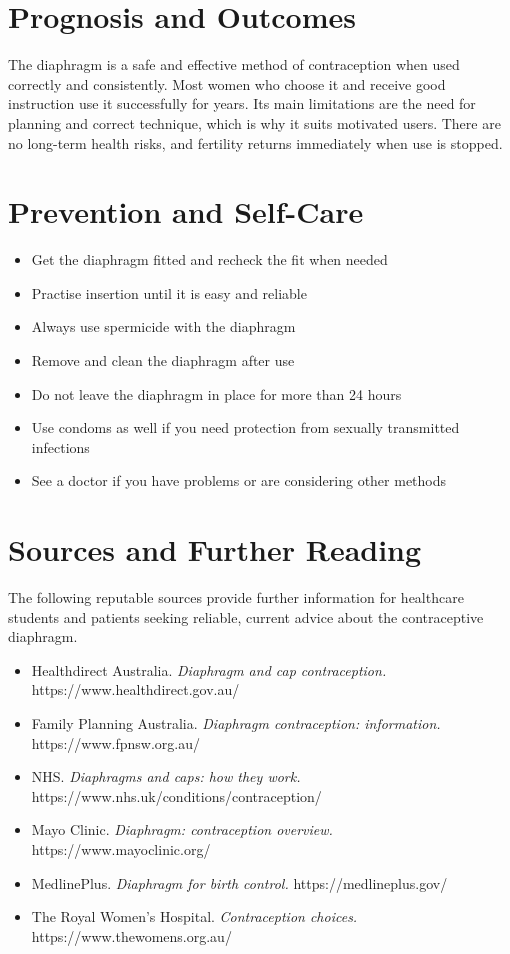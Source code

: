 \section*{Prognosis and Outcomes}
The diaphragm is a safe and effective method of contraception when used correctly and consistently. Most women who choose it and receive good instruction use it successfully for years. Its main limitations are the need for planning and correct technique, which is why it suits motivated users. There are no long-term health risks, and fertility returns immediately when use is stopped.

\section*{Prevention and Self-Care}
\begin{itemize}
    \item Get the diaphragm fitted and recheck the fit when needed
    \item Practise insertion until it is easy and reliable
    \item Always use spermicide with the diaphragm
    \item Remove and clean the diaphragm after use
    \item Do not leave the diaphragm in place for more than 24 hours
    \item Use condoms as well if you need protection from sexually transmitted infections
    \item See a doctor if you have problems or are considering other methods
\end{itemize}

\section*{Sources and Further Reading}
The following reputable sources provide further information for healthcare students and patients seeking reliable, current advice about the contraceptive diaphragm.

\begin{itemize}
    \item Healthdirect Australia. \textit{Diaphragm and cap contraception.} https://www.healthdirect.gov.au/
    \item Family Planning Australia. \textit{Diaphragm contraception: information.} https://www.fpnsw.org.au/
    \item NHS. \textit{Diaphragms and caps: how they work.} https://www.nhs.uk/conditions/contraception/
    \item Mayo Clinic. \textit{Diaphragm: contraception overview.} https://www.mayoclinic.org/
    \item MedlinePlus. \textit{Diaphragm for birth control.} https://medlineplus.gov/
    \item The Royal Women's Hospital. \textit{Contraception choices.} https://www.thewomens.org.au/
\end{itemize}
